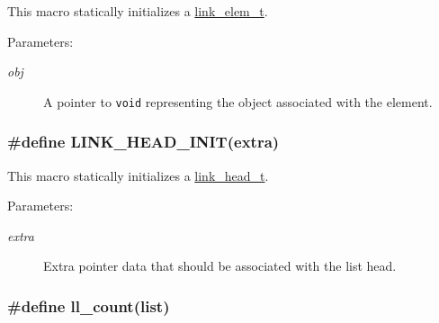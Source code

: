 This macro statically initializes a \hyperlink{group__dbprim__link_a1}{link\_\-elem\_\-t}.\begin{Desc}
\item[Parameters: ]\par
\begin{description}
\item[{\em 
obj}]A pointer to {\tt void} representing the object associated with the element. \end{description}
\end{Desc}
\hypertarget{group__dbprim__link_a13}{
\subsubsection[LINK\_\-HEAD\_\-INIT]{\setlength{\rightskip}{0pt plus 5cm}\#define LINK\_\-HEAD\_\-INIT(extra)}}
\label{group__dbprim__link_a13}


This macro statically initializes a \hyperlink{group__dbprim__link_a0}{link\_\-head\_\-t}.\begin{Desc}
\item[Parameters: ]\par
\begin{description}
\item[{\em 
extra}]Extra pointer data that should be associated with the list head. \end{description}
\end{Desc}
\hypertarget{group__dbprim__link_a15}{
\subsubsection[ll\_\-count]{\setlength{\rightskip}{0pt plus 5cm}\#define ll\_\-count(list)}}
\label{group__dbprim__link_a15}


